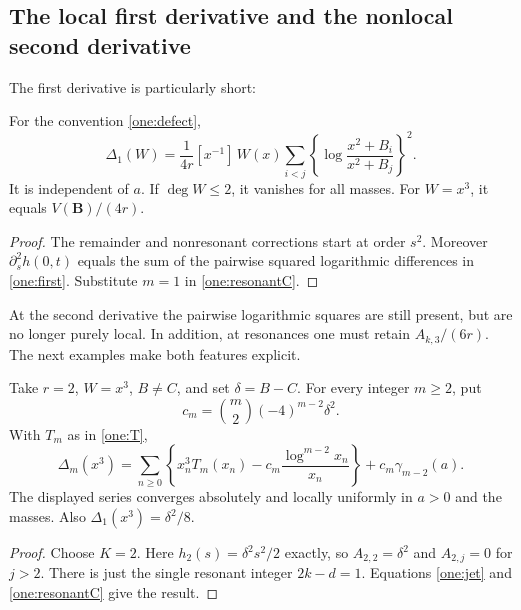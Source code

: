 \subsection{The local first derivative and the nonlocal second derivative}

The first derivative is particularly short:
\begin{corollary}\label{cor:firstanomaly}
For the convention \eqref{one:defect},
\begin{equation}\label{one:first}
 \Delta_1(W)=\frac1{4r}[x^{-1}]\,W(x)
       \sum_{i<j}\left\{\log\frac{x^2+B_i}{x^2+B_j}\right\}^{\!2}.
\end{equation}
It is independent of $a$.  If $\deg W\le2$, it vanishes for all masses.
For $W=x^3$, it equals $V(\boldsymbol B)/(4r)$.
\end{corollary}
\begin{proof}
The remainder and nonresonant corrections start at order $s^2$.
Moreover $\partial_s^2h(0,t)$ equals the sum of the pairwise squared
logarithmic differences in \eqref{one:first}.  Substitute $m=1$
in \eqref{one:resonantC}.
\end{proof}

At the second derivative the pairwise logarithmic squares are still
present, but are no longer purely local.  In addition, at resonances
one must retain $A_{k,3}/(6r)$.  The next examples make both features
explicit.

\begin{corollary}
\label{cor:singleStieltjes}
Take $r=2$, $W=x^3$, $B\ne C$, and set $\delta=B-C$.
For every integer $m\ge2$, put
\begin{equation}\label{one:cm}
 c_m=\binom m2(-4)^{m-2}\delta^2.
\end{equation}
With $T_m$ as in \eqref{one:T},
\begin{equation}\label{one:isolated}
 \boxed{\displaystyle
 \Delta_m(x^3)=
   \sum_{n\ge0}\left\{x_n^3T_m(x_n)
                -c_m\frac{\log^{m-2}x_n}{x_n}\right\}
       +c_m\gamma_{m-2}(a).}
\end{equation}
The displayed series converges absolutely and locally uniformly in
$a>0$ and the masses.  Also $\Delta_1(x^3)=\delta^2/8$.
\end{corollary}
\begin{proof}
Choose $K=2$.  Here $h_2(s)=\delta^2s^2/2$ exactly, so
$A_{2,2}=\delta^2$ and $A_{2,j}=0$ for $j>2$.
There is just the single resonant integer $2k-d=1$.  Equations
\eqref{one:jet} and \eqref{one:resonantC} give the result.
\end{proof}

